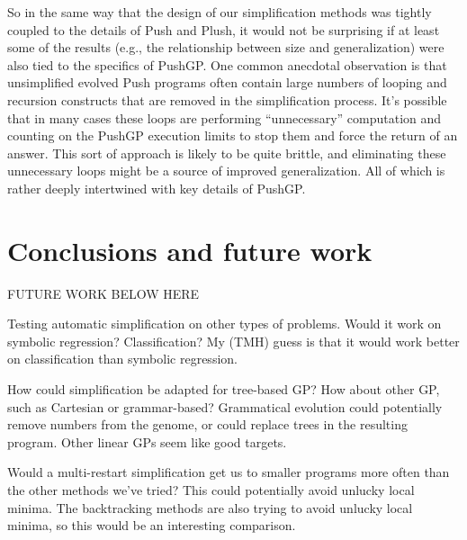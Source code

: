 So in the same way that the design of our simplification methods was
tightly coupled to the details of Push and Plush, it would not be surprising
if at least some of the results (e.g., the relationship between size and
generalization) were also tied to the specifics of PushGP. One common
anecdotal observation is that unsimplified evolved Push programs often
contain large numbers of looping and recursion constructs that are removed
in the simplification process. It's possible that in many cases these loops
are performing ``unnecessary'' computation and counting on the PushGP
execution limits to stop them and force the return of an answer. This sort
of approach is likely to be quite brittle, and eliminating these unnecessary
loops might be a source of improved generalization. All of which is rather
deeply intertwined with key details of PushGP.



\section{Conclusions and future work}
\label{sec:conclusions}


FUTURE WORK BELOW HERE

Testing automatic simplification on other types of problems. Would it work on symbolic regression? Classification? My (TMH) guess is that it would work better on classification than symbolic regression.

How could simplification be adapted for tree-based GP? How about other GP, such as Cartesian or grammar-based? Grammatical evolution could potentially remove numbers from the genome, or could replace trees in the resulting program. Other linear GPs seem like good targets.

Would a multi-restart simplification get us to smaller programs more often than the other methods we've tried? This could potentially avoid unlucky local minima. The backtracking methods are also trying to avoid unlucky local minima, so this would be an interesting comparison.

\begin{acks}
  

\end{acks}
